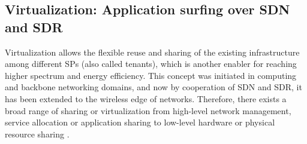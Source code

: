 \documentclass[conference]{IEEEtran}
\begin{document}
\subsection{Virtualization: Application surfing over SDN and SDR}
Virtualization allows the flexible reuse and sharing of the existing infrastructure among different SPs (also called tenants), which is another enabler for reaching higher spectrum and energy efficiency. This concept was initiated in computing and backbone networking domains, and now by cooperation of SDN and SDR, it has been extended to the wireless edge of networks. Therefore, there exists a broad range of sharing or virtualization from high-level network management, service allocation or application sharing to low-level hardware or physical resource sharing \cite{wen2013wireless,wen2014multi}.
\end{document}
